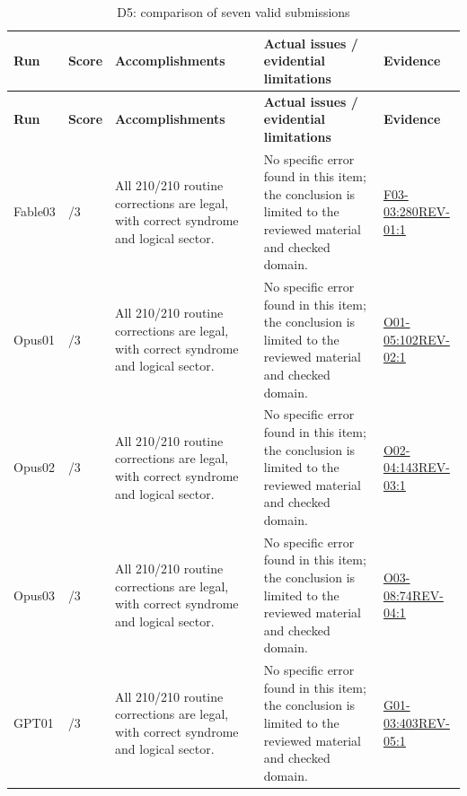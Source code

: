 \documentclass[11pt,a4paper]{article}
\begin{document}
{\fontsize{9.0}{12.6}\selectfont
\setlength{\tabcolsep}{2.5pt}
\begin{longtable}{>{\raggedright\arraybackslash}p{}>{\raggedright\arraybackslash}p{}>{\raggedright\arraybackslash}p{}>{\raggedright\arraybackslash}p{}>{\raggedright\arraybackslash}p{}}
\caption{D5: comparison of seven valid submissions}\\
\toprule
\textbf{Run} & \textbf{Score} & \textbf{Accomplishments} & \textbf{Actual issues /\allowbreak{} evidential limitations} & \textbf{Evidence}\tabularnewline
\midrule
\endfirsthead
\toprule
\textbf{Run} & \textbf{Score} & \textbf{Accomplishments} & \textbf{Actual issues /\allowbreak{} evidential limitations} & \textbf{Evidence}\tabularnewline
\midrule
\endhead
{}Fable03 & 3/\allowbreak{}3 & All 210/\allowbreak{}210 routine corrections are legal,\allowbreak{} with correct syndrome and logical sector. & No specific error found in this item; the conclusion is limited to the reviewed material and checked domain. & \hyperref[src:F03-03]{F03-03:280}\newline \hyperref[src:REV-01]{REV-01:1}\tabularnewline
{}Opus01 & 3/\allowbreak{}3 & All 210/\allowbreak{}210 routine corrections are legal,\allowbreak{} with correct syndrome and logical sector. & No specific error found in this item; the conclusion is limited to the reviewed material and checked domain. & \hyperref[src:O01-05]{O01-05:102}\newline \hyperref[src:REV-02]{REV-02:1}\tabularnewline
{}Opus02 & 3/\allowbreak{}3 & All 210/\allowbreak{}210 routine corrections are legal,\allowbreak{} with correct syndrome and logical sector. & No specific error found in this item; the conclusion is limited to the reviewed material and checked domain. & \hyperref[src:O02-04]{O02-04:143}\newline \hyperref[src:REV-03]{REV-03:1}\tabularnewline
{}Opus03 & 3/\allowbreak{}3 & All 210/\allowbreak{}210 routine corrections are legal,\allowbreak{} with correct syndrome and logical sector. & No specific error found in this item; the conclusion is limited to the reviewed material and checked domain. & \hyperref[src:O03-08]{O03-08:74}\newline \hyperref[src:REV-04]{REV-04:1}\tabularnewline
{}GPT01 & 3/\allowbreak{}3 & All 210/\allowbreak{}210 routine corrections are legal,\allowbreak{} with correct syndrome and logical sector. & No specific error found in this item; the conclusion is limited to the reviewed material and checked domain. & \hyperref[src:G01-03]{G01-03:403}\newline \hyperref[src:REV-05]{REV-05:1}\tabularnewline

\end{longtable}}
\end{document}
